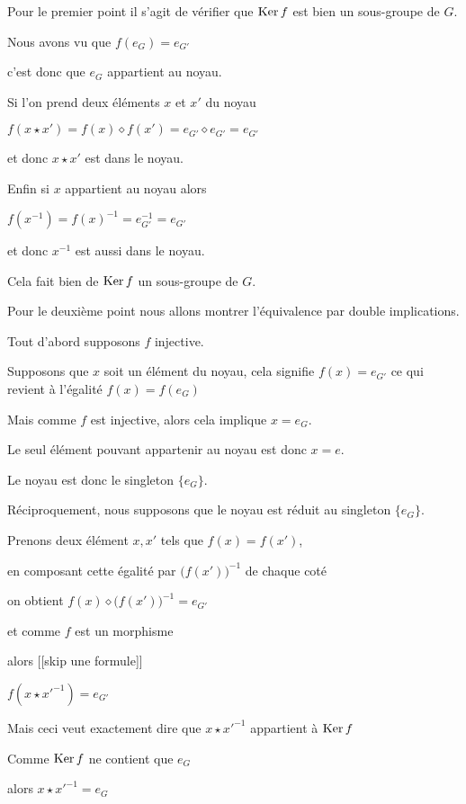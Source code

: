 Pour le premier point il s'agit de vérifier que $\mathop{\text{Ker}}\nolimits f$
est bien un sous-groupe de $G$.


Nous avons vu que $f(e_G)=e_{G'}$ 

c'est donc que $e_G$ appartient au noyau.

\change

Si l'on prend deux éléments $x$ et $x'$ du noyau

 $f(x\star x') = f(x) \diamond f(x')= e_{G'} \diamond e_{G'} = e_{G'}$

et donc $x \star x'$ est dans le noyau.

\change

Enfin si $x$ appartient au noyau alors

$f(x^{-1}) = f(x)^{-1}=e_{G'}^{-1} = e_{G'}$

et donc $x^{-1}$ est aussi dans le noyau.

Cela fait bien de $\mathop{\text{Ker}}\nolimits f$ un sous-groupe de $G$.

\change

Pour le deuxième point nous allons montrer l'équivalence par double implications.

Tout d'abord supposons $f$ injective.

Supposons que $x$ soit un élément du noyau, 
cela signifie  $f(x)=e_{G'}$ ce qui revient à l'égalité $f(x)=f(e_G)$

Mais comme $f$ est injective, alors cela implique $x=e_G$.

Le seul élément pouvant appartenir au noyau est donc $x=e$.

Le noyau est donc le singleton $\{e_G\}$.

\change

Réciproquement, nous supposons que le noyau est réduit au singleton $\{e_G\}$.

Prenons deux élément $x,x'$ tels que $f(x)=f(x')$,

en composant cette égalité par $\big( f(x') \big)^{-1}$ de chaque coté

on obtient $f(x)\diamond \big( f(x') \big)^{-1} = e_{G'}$ 

et comme $f$ est un morphisme

alors [[skip une formule]]

 $f(x \star x'^{-1}) = e_{G'}$


Mais ceci veut exactement dire que $x \star x'^{-1}$ appartient à $\mathop{\text{Ker}}\nolimits f$

Comme $\mathop{\text{Ker}}\nolimits f$ ne contient que $e_G$

alors $x \star x'^{-1} = e_G$ 

